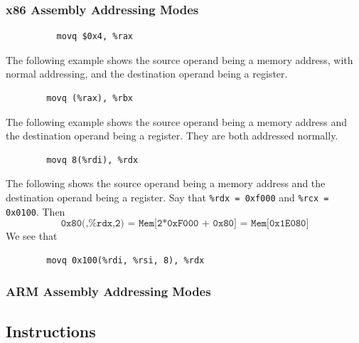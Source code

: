 \documentclass{article}
\begin{document}
    \subsubsection{x86 Assembly Addressing Modes}

      \begin{example}
        \begin{lstlisting} 
          movq $0x4, %rax
        \end{lstlisting}
      \end{example}

    \begin{example}
      The following example shows the source operand being a memory address, with normal addressing, and the destination operand being a register.  
      \begin{lstlisting} 
        movq (%rax), %rbx
      \end{lstlisting}
    \end{example}

    \begin{example}
      The following example shows the source operand being a memory address and the destination operand being a register. They are both addressed normally. 
      \begin{lstlisting} 
        movq 8(%rdi), %rdx
      \end{lstlisting}
    \end{example}

    \begin{example}
      The following shows the source operand being a memory address and the destination operand being a register. Say that \texttt{\%rdx = 0xf000} and \texttt{\%rcx = 0x0100}. Then 
      \begin{equation}
        \texttt{0x80(,\%rdx,2) = Mem[2*0xF000 + 0x80] = Mem[0x1E080]}
      \end{equation}
      We see that 
      \begin{lstlisting} 
        movq 0x100(%rdi, %rsi, 8), %rdx
      \end{lstlisting}
    \end{example}

    \subsubsection{ARM Assembly Addressing Modes}

  \subsection{Instructions} 
\end{document}
